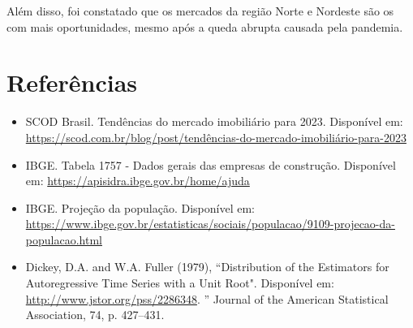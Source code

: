 \documentclass[12pt]{article}
\begin{document}
Além disso, foi constatado que os mercados da região Norte e Nordeste são os com mais
oportunidades, mesmo após a queda abrupta causada pela pandemia.


\section*{Referências} 
\begin{itemize} 
    \item SCOD Brasil. Tendências do mercado
    imobiliário para 2023. Disponível em: \url{https://scod.com.br/blog/post/tendências-do-mercado-imobiliário-para-2023}
    \item IBGE. Tabela 1757 - Dados gerais das empresas de construção. Disponível em: \url{https://apisidra.ibge.gov.br/home/ajuda} 
    \item IBGE. Projeção da população. Disponível em: \url{https://www.ibge.gov.br/estatisticas/sociais/populacao/9109-projecao-da-populacao.html}
    \item Dickey, D.A. and W.A. Fuller (1979), “Distribution of the Estimators
        for Autoregressive Time Series with a Unit Root". Disponível em:
        \url{http://www.jstor.org/pss/2286348}. ” Journal of the American
        Statistical Association, 74, p. 427–431.
\end{itemize}
\end{document}
